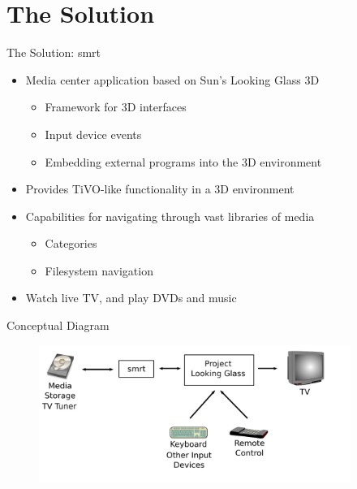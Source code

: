 \documentclass[style=smrt,mode=present,paper=screen]{powerdot}
\begin{document}
\section[slide=false]{The Solution}
\begin{slide}[toc=,bm=]{The Solution: smrt}
\begin{itemize}
\item Media center application based on Sun's Looking Glass 3D
\begin{itemize}
	\item Framework for 3D interfaces
	\item Input device events
	\item Embedding external programs into the 3D environment
\end{itemize}
\item Provides TiVO-like functionality in a 3D environment
\item Capabilities for navigating through vast libraries of media
\begin{itemize}
	\item Categories
	\item Filesystem navigation
\end{itemize}
\item Watch live TV, and play DVDs and music
\end{itemize}
\end{slide}


\begin{slide}{Conceptual Diagram}
\begin{figure}[htb]
	\includegraphics[width=4in]{../lib/figures/conceptual_overview}
\end{figure}
\end{slide}
\end{document}
